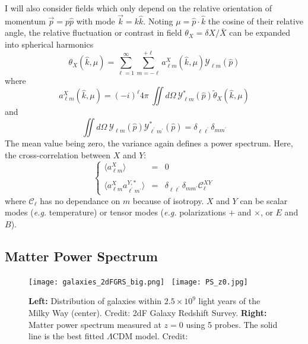 I will also consider fields which only depend on the relative orientation of momentum $\vec{p} = p \hat{p}$ with mode $\vec{k} = k \hat{k}$. Noting $\mu = \hat{p} \cdot \hat{k}$ the cosine of their relative angle, the relative fluctuation or contrast in field $\theta_X = \delta X / \bar{X}$ can be expanded into spherical harmonics
\begin{equation}
\label{eq:field_tensor}
\theta_X (\hat{k}, \mu) = \sum_{\ell = 1}^{\infty} \sum_{m = - \ell}^{+\ell} a^X_{\ell m} (\hat{k}, \mu) \mathcal{Y}_{\ell m} (\hat{p})
\end{equation} where
\begin{equation}
a^X_{\ell m} (\hat{k}, \mu) = (-i)^\ell 4\pi ~\iint d\Omega ~ \mathcal{Y}^{\ast}_{\ell m} (\hat{p}) \tilde{\theta}_X (\hat{k}, \mu)
\end{equation} and
\begin{equation}
\iint d\Omega ~\mathcal{Y}_{\ell m} (\hat{p}) \mathcal{Y}^{\ast}_{\ell^\prime m^\prime} (\hat{p}) = \delta_{\ell \ell^\prime} \delta_{mm^\prime}
\end{equation} The mean value being zero, the variance again defines a power spectrum. Here, the cross-correlation between $X$ and $Y$:
\begin{equation}
\label{eq:ps_ang_corr}
\left\{
\begin{array}{lcl}
\langle a^X_{\ell m} \rangle & = & 0\\
\\
\langle a^X_{\ell m} a^{Y,\ast}_{\ell^\prime m^\prime} \rangle  & = & \delta_{\ell \ell^\prime} \delta_{mm^\prime} \mathcal{C}^{XY}_\ell
\end{array}
\right.
\end{equation} where $\mathcal{C}_\ell$ has no dependance on $m$ because of  isotropy. $X$ and $Y$ can be scalar modes (\textit{e.g.} temperature) or tensor modes (\textit{e.g.} polarizations $+$ and $\times$, or $E$ and $B$). 



\subsection{Matter Power Spectrum}

\begin{figure}[!]
\begin{center}
\texttt{[image: galaxies\_2dFGRS\_big.png]}~%
\texttt{[image: PS\_z0.jpg]}
\caption{\textbf{Left:} Distribution of galaxies within $2.5 \times 10^9$ light years of the Milky Way (center). Credit: 2dF Galaxy Redshift Survey. \textbf{Right:} Matter power spectrum measured at $z=0$ using 5 probes. The solid line is the best fitted $\Lambda$CDM model. Credit: \cite{PowerSpectrum_Tegmark}}
\label{fig:LSS}
\end{center}
\end{figure}

